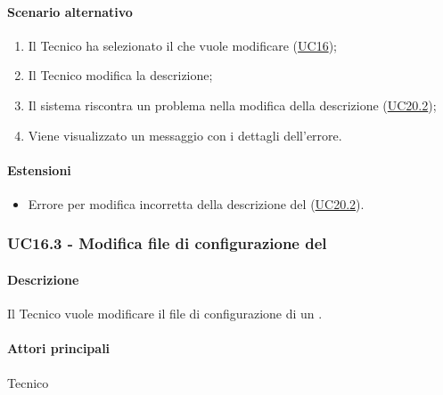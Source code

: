 \paragraph*{Scenario alternativo}
\begin{enumerate}
  \item Il Tecnico ha selezionato il  che vuole modificare (\hyperref[UC16]{UC16});
  \item Il Tecnico modifica la descrizione;
  \item Il sistema riscontra un problema nella modifica della descrizione (\hyperref[UC20point2]{UC20.2});
  \item Viene visualizzato un messaggio con i dettagli dell'errore.
\end{enumerate}

\paragraph*{Estensioni}
\begin{itemize}
  \item Errore per modifica incorretta della descrizione del  (\hyperref[UC20point2]{UC20.2}).
\end{itemize}


\subsubsection{UC16.3 - Modifica file di configurazione del }\label{UC16point3}
\paragraph*{Descrizione}
Il Tecnico vuole modificare il file di configurazione di un .

\paragraph*{Attori principali}
Tecnico

